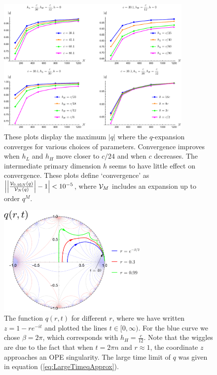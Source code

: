 \begin{figure}
\centering
\includegraphics[width=0.85\textwidth]{virasoro_chapter/qConvergentRange}	
\caption{These plots display the maximum  $|q|$ where the $q$-expansion converges for various choices of parameters.  Convergence improves when $h_L$ and $h_H$ move closer to $c/24$ and when $c$ decreases.  The intermediate primary dimension $h$ seems to have little effect on convergence.   These plots define `convergence' as $\left|\left|\frac{{\cal V}_{0.95N}(q)}{{\cal V}_N(q)}\right|-1\right|<10^{-5}$, where ${\cal V}_M$ includes an expansion up to order $q^M$.} 
\label{qConvergentRange}
\end{figure}


\begin{figure}
\centering
\includegraphics[width=0.65\textwidth]{virasoro_chapter/q_trajectory_with_BC}	
\caption{The function $q(r,t)$ for different $r$, where we have written $z = 1 - r e^{-it}$ and plotted the lines $t \in [0, \infty)$. For the blue curve we chose $\beta = 2 \pi$, which corresponds with $h_H = \frac{c}{12}$.  Note that the wiggles are due to the fact that when $t = 2 \pi n$ and $r \approx 1$, the coordinate $z$ approaches an OPE singularity. The large time limit of $q$ was given in equation (\ref{eq:LargeTimeqApprox}).}
\label{fig:qoft}
\end{figure}


